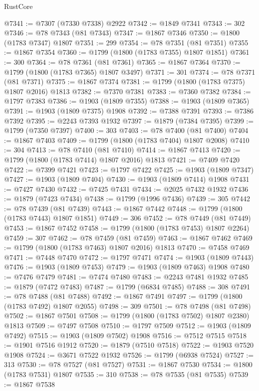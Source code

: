 \begin{lexlean}{RustCore}
\begin{coremodule}
@7341 := @7307 (@7330 @7338) @2922
@7342 := @1849 @7341
@7343 := 302
@7346 := @78 @7343 (@81 @7343)
@7347 := @1867 @7346
@7350 := @1800 (@1783 @7347) @1807
@7351 := 299
@7354 := @78 @7351 (@81 @7351)
@7355 := @1867 @7354
@7360 := @1799 (@1800 (@1783 @7355) @1807 @1851)
@7361 := 300
@7364 := @78 @7361 (@81 @7361)
@7365 := @1867 @7364
@7370 := @1799 (@1800 (@1783 @7365) @1807 @3497)
@7371 := 301
@7374 := @78 @7371 (@81 @7371)
@7375 := @1867 @7374
@7381 := @1799 (@1800 (@1783 @7375) @1807 @2016) @1813
@7382 := @7370 @7381
@7383 := @7360 @7382
@7384 := @1797 @7383
@7386 := @1903 (@1809 @7355)
@7388 := @1903 (@1809 @7365)
@7391 := @1903 (@1809 @7375) @1908
@7392 := @7388 @7391
@7393 := @7386 @7392
@7395 := @2243 @7393 @1932
@7397 := @1879 (@7384 @7395)
@7399 := @1799 (@7350 @7397)
@7400 := 303
@7403 := @78 @7400 (@81 @7400)
@7404 := @1867 @7403
@7409 := @1799 (@1800 (@1783 @7404) @1807 @2008)
@7410 := 304
@7413 := @78 @7410 (@81 @7410)
@7414 := @1867 @7413
@7420 := @1799 (@1800 (@1783 @7414) @1807 @2016) @1813
@7421 := @7409 @7420
@7422 := @7399 @7421
@7423 := @1797 @7422
@7425 := @1903 (@1809 @7347)
@7427 := @1903 (@1809 @7404)
@7430 := @1903 (@1809 @7414) @1908
@7431 := @7427 @7430
@7432 := @7425 @7431
@7434 := @2025 @7432 @1932
@7436 := @1879 (@7423 @7434)
@7438 := @1799 (@1996 @7436)
@7439 := 305
@7442 := @78 @7439 (@81 @7439)
@7443 := @1867 @7442
@7448 := @1799 (@1800 (@1783 @7443) @1807 @1851)
@7449 := 306
@7452 := @78 @7449 (@81 @7449)
@7453 := @1867 @7452
@7458 := @1799 (@1800 (@1783 @7453) @1807 @2264)
@7459 := 307
@7462 := @78 @7459 (@81 @7459)
@7463 := @1867 @7462
@7469 := @1799 (@1800 (@1783 @7463) @1807 @2016) @1813
@7470 := @7458 @7469
@7471 := @7448 @7470
@7472 := @1797 @7471
@7474 := @1903 (@1809 @7443)
@7476 := @1903 (@1809 @7453)
@7479 := @1903 (@1809 @7463) @1908
@7480 := @7476 @7479
@7481 := @7474 @7480
@7483 := @2243 @7481 @1932
@7485 := @1879 (@7472 @7483)
@7487 := @1799 (@6834 @7485)
@7488 := 308
@7491 := @78 @7488 (@81 @7488)
@7492 := @1867 @7491
@7497 := @1799 (@1800 (@1783 @7492) @1807 @2055)
@7498 := 309
@7501 := @78 @7498 (@81 @7498)
@7502 := @1867 @7501
@7508 := @1799 (@1800 (@1783 @7502) @1807 @2380) @1813
@7509 := @7497 @7508
@7510 := @1797 @7509
@7512 := @1903 (@1809 @7492)
@7515 := @1903 (@1809 @7502) @1908
@7516 := @7512 @7515
@7518 := @1901 @7516 @1912
@7520 := @1879 (@7510 @7518)
@7522 := @1903 @7520 @1908
@7524 := @3671 @7522 @1932
@7526 := @1799 (@6938 @7524)
@7527 := 313
@7530 := @78 @7527 (@81 @7527)
@7531 := @1867 @7530
@7534 := @1800 (@1783 @7531) @1807
@7535 := 310
@7538 := @78 @7535 (@81 @7535)
@7539 := @1867 @7538

\end{coremodule}
\end{lexlean}
